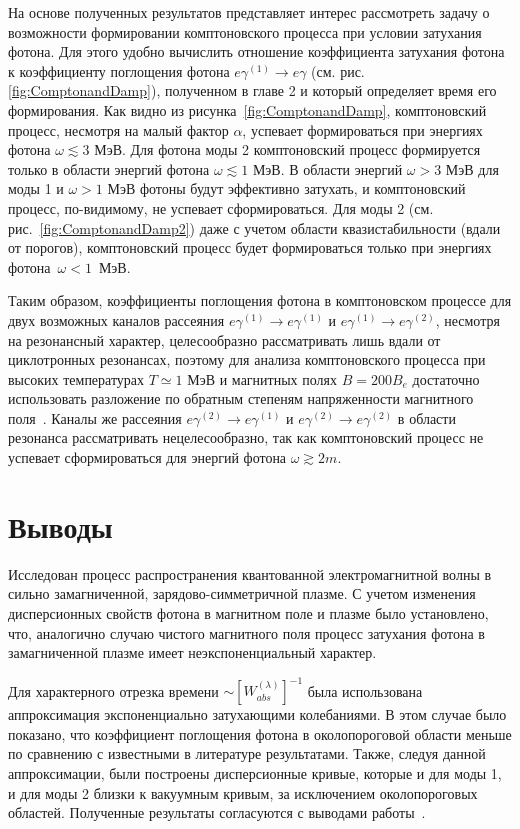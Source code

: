 На основе полученных результатов представляет интерес рассмотреть задачу о возможности формировании комптоновского процесса при условии затухания фотона. Для этого удобно вычислить отношение коэффициента затухания фотона к коэффициенту поглощения фотона $e\gamma^{(1)}\to e\gamma$  (см. рис. \ref{fig:ComptonandDamp}), полученном в главе 2 и который определяет время его формирования. Как видно из рисунка~\ref{fig:ComptonandDamp}, комптоновский процесс, несмотря на малый фактор $\alpha$, успевает формироваться при энергиях фотона $\omega\lesssim3$ МэВ. Для фотона моды 2 комптоновский процесс формируется только в области энергий фотона $\omega\lesssim1$ МэВ. В области энергий $\omega>3$ МэВ для моды 1 и $\omega>1$ МэВ фотоны будут эффективно затухать, и комптоновский процесс, по-видимому, не успевает сформироваться. Для моды 2 (см. рис.~\ref{fig:ComptonandDamp2}) даже с учетом области квазистабильности (вдали от порогов), комптоновский процесс будет формироваться только при энергиях фотона~$\omega<1$~МэВ.

Таким образом, коэффициенты поглощения фотона в комптоновском процессе для двух возможных каналов рассеяния $e\gamma^{(1)}  \to e\gamma^{(1)}$ и $e\gamma^{(1)}  \to e\gamma^{(2)}$, несмотря на резонансный характер, целесообразно рассматривать лишь вдали от циклотронных резонансах, поэтому для анализа комптоновского процесса при высоких температурах $T\simeq 1$ МэВ и магнитных полях $B=200 B_e$ достаточно использовать разложение по обратным степеням напряженности магнитного поля~\cite{Chistyakov:2009}. Каналы же рассеяния $e\gamma^{(2)}  \to e\gamma^{(1)}$  и $e\gamma^{(2)}  \to e\gamma^{(2)}$ в области резонанса рассматривать нецелесообразно, так как комптоновский процесс не успевает сформироваться для энергий фотона $\omega\gtrsim 2m$.

\newpage

\section{Выводы}
Исследован процесс распространения квантованной электромагнитной волны в сильно замагниченной, зарядово-симметричной плазме. С учетом изменения дисперсионных свойств фотона в магнитном поле и плазме было установлено, что, аналогично случаю чистого магнитного поля процесс затухания фотона
в замагниченной плазме имеет неэкспоненциальный характер. 

Для характерного отрезка времени $\sim [W^{{(\lambda)}}_{abs}]^{-1}$ была использована аппроксимация экспоненциально затухающими колебаниями. В этом случае было
показано, что коэффициент поглощения фотона в околопороговой области меньше по сравнению с известными в литературе результатами. Также, следуя данной аппроксимации, были построены дисперсионные кривые, которые и для моды 1, и для моды 2 близки к вакуумным кривым, за исключением околопороговых областей. Полученные результаты согласуются с выводами работы~\cite{Shabad:1988}.

